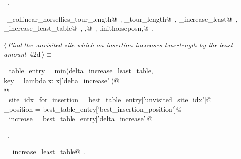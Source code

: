 \documentclass[11.5pt]{report}
\begin{document}
\begin{flushleft}
\begin{list}{}{}
\mbox{}\verb@                                   'best_insertion_position' : ibest, \@\\
\mbox{}\verb@                                   'delta_increase'          : delta_increase_least})@\\
\mbox{}\verb@@{\NWsep}
\end{list}
\vspace{-1.5ex}
\footnotesize
\begin{list}{}{\setlength{\itemsep}{-\parsep}\setlength{\itemindent}{-\leftmargin}}
\item \NWtxtMacroRefIn\ .
\item \NWtxtIdentsUsed\nobreak\  \verb@compute_collinear_horseflies_tour_length@\nobreak\ , \verb@current_tour_length@\nobreak\ , \verb@delta_increase_least@\nobreak\ , \verb@delta_increase_least_table@\nobreak\ , \verb@ibest,@\nobreak\ , \verb@self.inithorseposn,@\nobreak\ .
\item{}
\end{list}
\vspace{4ex}
\end{flushleft}
\vspace{-0.8cm}\newchunk 
\begin{flushleft} \small\label{scrap51}\raggedright\small
{} $\langle\,${\itshape Find the unvisited site which on insertion increases tour-length by the least amount}\nobreak\ {\footnotesize {42d}}$\,\rangle\equiv$
\vspace{-1ex}
\begin{list}{}{} \item
\mbox{}\verb@best_table_entry = min(delta_increase_least_table, \@\\
\mbox{}\verb@                         key = lambda x: x['delta_increase'])@\\
\mbox{}\verb@         @\\
\mbox{}\verb@unvisited_site_idx_for_insertion = best_table_entry['unvisited_site_idx']@\\
\mbox{}\verb@insertion_position               = best_table_entry['best_insertion_position']@\\
\mbox{}\verb@delta_increase                   = best_table_entry['delta_increase']@\\
\mbox{}\verb@@{\NWsep}
\end{list}
\vspace{-1.5ex}
\footnotesize
\begin{list}{}{\setlength{\itemsep}{-\parsep}\setlength{\itemindent}{-\leftmargin}}
\item \NWtxtMacroRefIn\ .
\item \NWtxtIdentsUsed\nobreak\  \verb@delta_increase_least_table@\nobreak\ .
\item{}
\end{list}
\vspace{4ex}
\end{flushleft}
\end{document}
